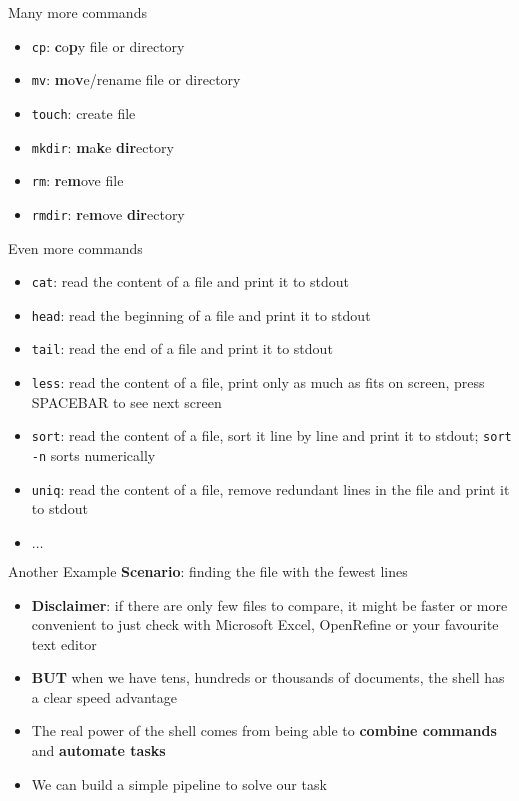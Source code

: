 \documentclass[hyperref={pdfpagelabels=false},aspectratio=169]{beamer}
\begin{document}
\begin{frame}{Many more commands}
    
    \begin{itemize}
        \item \texttt{cp}: \textbf{c}o\textbf{p}y file or directory
        \item \texttt{mv}: \textbf{m}o\textbf{v}e/rename file or directory
        \item \texttt{touch}: create file
        \item \texttt{mkdir}: \textbf{m}a\textbf{k}e \textbf{dir}ectory
        \item \texttt{rm}: \textbf{r}e\textbf{m}ove file
        \item \texttt{rmdir}: \textbf{r}e\textbf{m}ove \textbf{dir}ectory
    \end{itemize}
\end{frame}

\begin{frame}{Even more commands}
    
    \begin{itemize}
        \item \texttt{cat}: read the content of a file and print it to stdout
        \item \texttt{head}: read the beginning of a file and print it to stdout
        \item \texttt{tail}: read the end of a file and print it to stdout
        \item \texttt{less}: read the content of a file, print only as much as fits on screen, press SPACEBAR to see next screen
        \item \texttt{sort}: read the content of a file, sort it line by line and print it to stdout; \texttt{sort -n} sorts numerically
        \item \texttt{uniq}: read the content of a file, remove redundant lines in the file and print it to stdout
        \item $\dots$
    \end{itemize}
\end{frame}


\begin{frame}{Another Example}
    \textbf{Scenario}: finding the file with the fewest lines
    
    \begin{itemize}
        \item \textbf{Disclaimer}: if there are only few files to compare, it might be faster or more convenient to just check with Microsoft Excel, OpenRefine or your favourite text editor
        \item \textbf{BUT} when we have tens, hundreds or thousands of documents, the shell has a clear speed advantage
        \item The real power of the shell comes from being able to \textbf{combine commands} and \textbf{automate tasks}
        \item We can build a simple pipeline to solve our task
    \end{itemize}
\end{frame}
\end{document}

